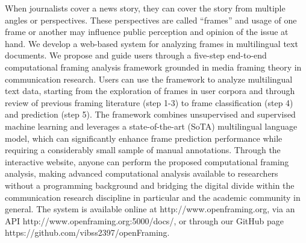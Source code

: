 When journalists cover a news story, they can cover the story from multiple angles or perspectives. These perspectives are called ``frames'' and usage of one frame or another may influence public perception and opinion of the issue at hand. We develop a web-based system for analyzing frames in multilingual text documents. We propose and guide users through a five-step end-to-end computational framing analysis framework grounded in media framing theory in communication research. Users can use the framework to analyze multilingual text data, starting from the exploration of frames in user corpora and through review of previous framing literature (step 1-3) to frame classification (step 4) and prediction (step 5). The framework combines unsupervised and supervised machine learning and leverages a state-of-the-art (SoTA) multilingual language model, which can significantly enhance frame prediction performance while requiring a considerably small sample of manual annotations. Through the interactive website, anyone can perform the proposed computational framing analysis, making advanced computational analysis available to researchers without a programming background and bridging the digital divide within the communication research discipline in particular and the academic community in general. The system is available online at http://www.openframing.org, via an API http://www.openframing.org:5000/docs/, or through our GitHub page https://github.com/vibss2397/openFraming.